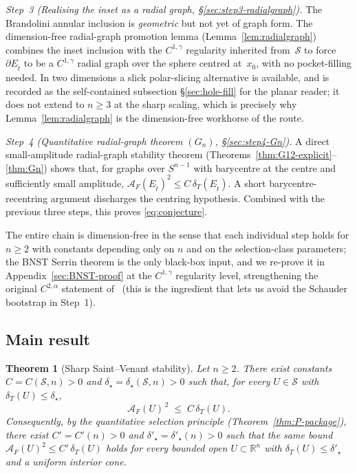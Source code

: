 \documentclass[11pt]{amsart}
\newtheorem{theorem}{Theorem}[section]
\newcommand{\R}{\mathbb R}
\newcommand{\Et}{E_{\hat t}}
\newcommand{\dT}{\delta_T}
\newcommand{\AF}{\mathcal A_F}
\newcommand{\Sclass}{\mathcal S}
\begin{document}
\smallskip
\noindent\emph{Step~3 (Realising the inset as a radial graph,
\S\ref{sec:step3-radialgraph}).}  The Brandolini annular inclusion is
\emph{geometric} but not yet of graph form.  The dimension-free
radial-graph promotion lemma (Lemma~\ref{lem:radialgraph}) combines
the inset inclusion with the $C^{1,\gamma}$ regularity inherited
from~$\Sclass$ to force $\partial\Et$ to be a $C^{1,\gamma}$ radial
graph over the sphere centred at~$x_0$, with no pocket-filling needed.
In two dimensions a slick polar-slicing alternative is available, and
is recorded as the self-contained subsection \S\ref{sec:hole-fill} for
the planar reader; it does not extend to $n\ge 3$ at the sharp
scaling, which is precisely why Lemma~\ref{lem:radialgraph} is the
dimension-free workhorse of the route.

\smallskip
\noindent\emph{Step~4 (Quantitative radial-graph theorem $(G_n)$,
\S\ref{sec:step4-Gn}).}  A direct small-amplitude radial-graph
stability theorem
(Theorems~\ref{thm:G12-explicit}--\ref{thm:Gn}) shows that, for
graphs over $S^{n-1}$ with barycentre at the centre and sufficiently
small amplitude, $\AF(\Et)^{2}\le C\,\dT(\Et)$.  A short
barycentre-recentring argument discharges the centring hypothesis.
Combined with the previous three steps, this proves
\eqref{eq:conjecture}.

\smallskip

The entire chain is dimension-free in the sense that each individual
step holds for $n\ge 2$ with constants depending only on $n$ and on
the selection-class parameters; the BNST Serrin theorem is the only
black-box input, and we re-prove it in Appendix~\ref{sec:BNST-proof}
at the $C^{1,\gamma}$ regularity level, strengthening the original
$C^{2,\alpha}$ statement of~\cite{BNST} (this is the
ingredient that lets us avoid the Schauder bootstrap in Step~1).

\subsection*{Main result}

\begin{theorem}[Sharp Saint--Venant stability]\label{thm:main}
Let $n\ge 2$.  There exist constants $C=C(\Sclass,n)>0$ and
$\delta_\star=\delta_\star(\Sclass,n)>0$ such that, for every
$U\in\Sclass$ with $\dT(U)\le\delta_\star$,
\[
   \AF(U)^{\,2} \;\le\; C\,\dT(U).
\]
Consequently, by the quantitative selection principle
(Theorem~\ref{thm:P-package}), there exist $C'=C'(n)>0$ and
$\delta'_\star=\delta'_\star(n)>0$ such that the same bound
$\AF(U)^{2}\le C'\,\dT(U)$ holds for every bounded open
$U\subset\R^n$ with $\dT(U)\le\delta'_\star$ and a uniform interior
cone.
\end{theorem}
\end{document}
